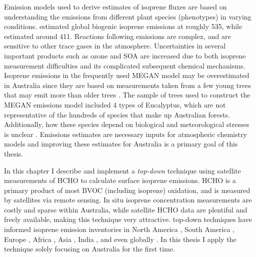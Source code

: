   
  Emission models used to derive estimates of isoprene fluxes are based on understanding the emissions from different plant species (phenotypes) in varying conditions.
  \textcite{Guenther2012} estimated global biogenic isoprene emissions at roughly 535\tgpyr, while \textcite{Sindelarova2014} estimated around 411\tgpyr.
  Reactions following emissions are complex, and are sensitive to other trace gases in the atmosphere.
  Uncertainties in several important products such as ozone and SOA are increased due to both isoprene measurement difficulties and its complicated subsequent chemical mechanisms.
  Isoprene emissions in the frequently used MEGAN model may be overestimated in Australia since they are based on measurements taken from a few young trees \parencite{Winters2009} that may emit more than older trees \parencite{Emmerson2016}.
  The sample of trees used to construct the MEGAN emissions model included 4 types of Eucalyptus, which are not representative of the hundreds of species that make up Australian forests.
  Additionally, how these species depend on biological and meteorological stresses is unclear \parencite{Winters2009, FortemsCheiney2012}.
  Emissions estimates are necessary inputs for atmospheric chemistry models and improving these estimates for Australia is a primary goal of this thesis.
  
  
  In this chapter I describe and implement a \textit{top-down} technique using satellite measurements of HCHO to calculate surface isoprene emissions.
  HCHO is a primary product of most BVOC (including isoprene) oxidation, and is measured by satellites via remote sensing.
  In situ isoprene concentration measurements are costly and sparse within Australia, while satellite HCHO data are plentiful and freely available, making this technique very attractive.
  top-down techniques have informed isoprene emission inventories in North America \parencite{Abbot2003,Palmer2003,Palmer2006,Millet2006,Millet2008}, South America \parencite{Barkley2013}, Europe \parencite{Dufour2009,Curci2010}, Africa \parencite{Marais2012}, Asia \parencite{Fu2007,Stavrakou2014}, India \parencite{Surl2018}, and even globally \parencite{Shim2005,FortemsCheiney2012,Bauwens2016}.
  In this thesis I apply the technique solely focusing on Australia for the first time.
  
